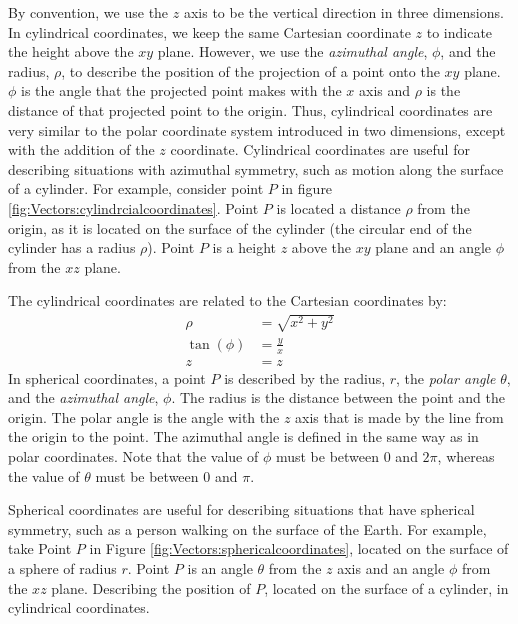 By convention, we use the $z$ axis to be the vertical direction in three dimensions. In cylindrical coordinates, we keep the same Cartesian coordinate $z$ to indicate the height above the $xy$ plane. However, we use the \textit{azimuthal angle}, $\phi$, and the radius, $\rho$, to describe the position of the projection of a point onto the $xy$ plane. $\phi$ is the angle that the projected point makes with the $x$ axis and $\rho$ is the distance of that projected point to the origin. Thus, cylindrical coordinates are very similar to the polar coordinate system introduced in two dimensions, except with the addition of the $z$ coordinate. Cylindrical coordinates are useful for describing situations with azimuthal symmetry, such as motion along the surface of a cylinder. For example, consider point $P$ in figure \ref{fig:Vectors:cylindrcialcoordinates}. Point $P$ is located a distance $\rho$ from the origin, as it is located on the surface of the cylinder (the circular end of the cylinder has a radius $\rho$). Point $P$ is a height $z$ above the $xy$ plane and an angle $\phi$ from the $xz$ plane.

 The cylindrical coordinates are related to the Cartesian coordinates by:
\begin{align*}
\rho &= \sqrt{x^2+y^2}\\
\tan(\phi) &= \frac{y}{x}\\
z&=z
\end{align*}
In spherical coordinates, a point $P$ is described by the radius, $r$, the \textit{polar angle} $\theta$, and the \textit{azimuthal angle}, $\phi$. The radius is the distance between the point and the origin. The polar angle is the angle with the $z$ axis that is made by the line from the origin to the point. The azimuthal angle is defined in the same way as in polar coordinates. Note that the value of $\phi$ must be between $0$ and $2\pi$, whereas the value of $\theta$ must be between $0$ and $\pi$. 

Spherical coordinates are useful for describing situations that have spherical symmetry, such as a person walking on the surface of the Earth. For example, take Point $P$ in Figure \ref{fig:Vectors:sphericalcoordinates}, located on the surface of a sphere of radius $r$. Point $P$ is an angle $\theta$ from the $z$ axis and an angle $\phi$ from the $xz$ plane. 
{\label{fig:Vectors:cylindricalcoordinates} Describing the position of $P$, located on the surface of a cylinder, in cylindrical coordinates.}

